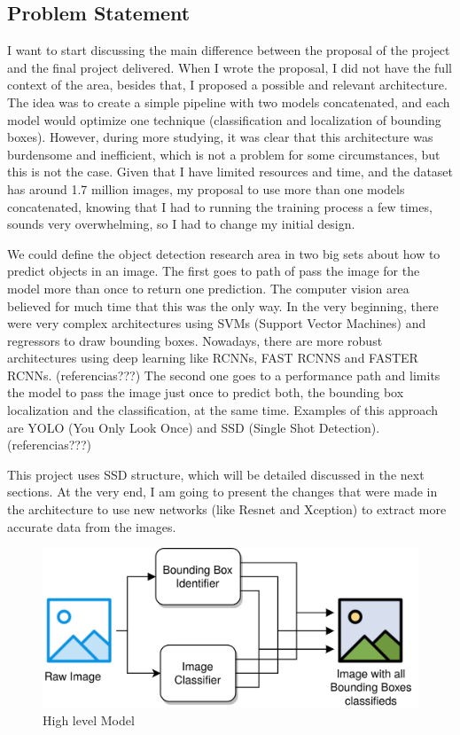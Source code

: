 \documentclass[11pt, a4paper, twocolumn]{article}
\begin{document}
\subsection{Problem Statement}

I want to start discussing the main difference between the proposal of the project and the final project delivered. When I wrote the proposal, I did not have the full context of the area, besides that, I proposed a possible and relevant architecture. The idea was to create a simple pipeline with two models concatenated, and each model would optimize one technique (classification and localization of bounding boxes). However, during more studying, it was clear that this architecture was burdensome and inefficient, which is not a problem for some circumstances, but this is not the case. Given that I have limited resources and time, and the dataset has around 1.7 million images, my proposal to use more than one models concatenated, knowing that I had to running the training process a few times, sounds very overwhelming, so I had to change my initial design.

We could define the object detection research area in two big sets about how to predict objects in an image. The first goes to path of pass the image for the model more than once to return one prediction. The computer vision area believed for much time that this was the only way. In the very beginning, there were very complex architectures using SVMs (Support Vector Machines) and regressors to draw bounding boxes. Nowadays, there are more robust architectures using deep learning like RCNNs, FAST RCNNS and FASTER RCNNs. (referencias???) The second one goes to a performance path and limits the model to pass the image just once to predict both, the bounding box localization and the classification, at the same time. Examples of this approach are YOLO (You Only Look Once) and SSD (Single Shot Detection). (referencias???)

This project uses SSD structure, which will be detailed discussed in the next sections. At the very end, I am going to present the changes that were made in the architecture to use new networks (like Resnet and Xception) to extract more accurate data from the images.

\begin{figure}[ht]
	\centering
	\includegraphics[width=.4\textwidth]{high-level-architecture.jpg}
	\caption{\scriptsize High level Model}
\end{figure}
\end{document}
